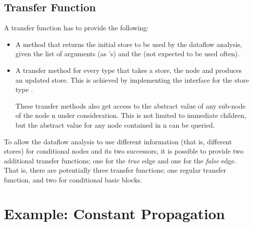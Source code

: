 \subsection{Transfer Function}
\label{sec:transfer-fnc}

A transfer function has to provide the following:
\begin{itemize}
\item A method that returns the initial store to be used by the dataflow analysis, given
the list of arguments (as 's) and the  (not expected to be used often).
\item A transfer method for every  type that takes a store, the node and produces
an updated store. This is achieved by implementing the  interface
for the store type .

\begin{new}
These transfer methods also get access to the abstract value of any sub-node of the node \code n
under consideration.  This is not limited to immediate children, but the abstract value for any node contained
in \code n can be queried.
\end{new}
\end{itemize}

To allow the dataflow analysis to use different information (that is, different stores)
for conditional nodes and its two successors, it is possible to provide two additional
transfer functions; one for the \emph{true} edge and one for the \emph{false} edge.
That is, there are potentially three transfer functions; one regular transfer function, and two
for conditional basic blocks.


\section{Example: Constant Propagation}

